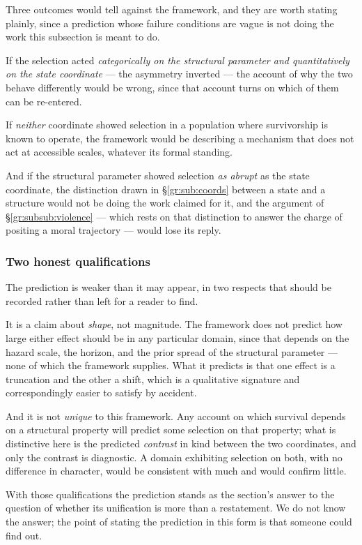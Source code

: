 \documentclass[11pt]{article}
\numberwithin{equation}{section}
\theoremstyle{plain}
\theoremstyle{definition}
\theoremstyle{remark}
\begin{document}
Three outcomes would tell against the framework, and they are worth
stating plainly, since a prediction whose failure conditions are vague
is not doing the work this subsection is meant to do.

If the selection acted \emph{categorically on the structural parameter
and quantitatively on the state coordinate} --- the asymmetry inverted
--- the account of why the two behave differently would be wrong, since
that account turns on which of them can be re-entered.

If \emph{neither} coordinate showed selection in a population where
survivorship is known to operate, the framework would be describing a
mechanism that does not act at accessible scales, whatever its formal
standing.

And if the structural parameter showed selection \emph{as abrupt} as
the state coordinate, the distinction drawn in
\S\ref{gr:sub:coords} between a state and a structure would not be doing
the work claimed for it, and the argument of
\S\ref{gr:subsub:violence} --- which rests on that distinction to answer
the charge of positing a moral trajectory --- would lose its reply.

\subsubsection{Two honest qualifications}
\label{gr:subsub:crossqual}

The prediction is weaker than it may appear, in two respects that should
be recorded rather than left for a reader to find.

It is a claim about \emph{shape}, not magnitude. The framework does not
predict how large either effect should be in any particular domain,
since that depends on the hazard scale, the horizon, and the prior
spread of the structural parameter --- none of which the framework
supplies. What it predicts is that one effect is a truncation and the
other a shift, which is a qualitative signature and correspondingly
easier to satisfy by accident.

And it is not \emph{unique} to this framework. Any account on which
survival depends on a structural property will predict some selection on
that property; what is distinctive here is the predicted \emph{contrast}
in kind between the two coordinates, and only the contrast is
diagnostic. A domain exhibiting selection on both, with no difference in
character, would be consistent with much and would confirm little.

With those qualifications the prediction stands as the section's answer
to the question of whether its unification is more than a restatement.
We do not know the answer; the point of stating the prediction in this
form is that someone could find out.
\end{document}
